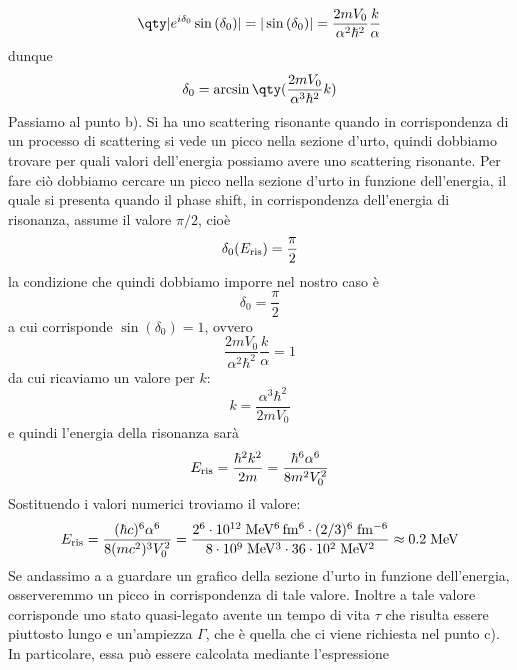 \begin{soluzione}
   \begin{equation*}
      \qty| e^{i\delta_0} \sin{(\delta_0)} |
      =| \sin{(\delta_0)} |
      =\frac{2 m V_0}{\alpha^2 \hbar^2} \frac{k}{\alpha}
   \end{equation*}
   dunque
   \begin{equation}
      \delta_0
      =\arcsin{\qty( \frac{2 m V_0}{\alpha^3 \hbar^2} k )}
      \label{eq:delta_0_non_small}
   \end{equation}
   Passiamo al punto b). Si ha uno scattering risonante quando in corrispondenza di un processo di scattering si vede un picco nella sezione d'urto, quindi dobbiamo trovare per quali valori dell'energia possiamo avere uno scattering risonante. Per fare ciò dobbiamo cercare un picco nella sezione d'urto in funzione dell'energia, il quale si presenta quando il phase shift, in corrispondenza dell'energia di risonanza, assume il valore $\pi/2$, cioè
   \begin{equation*}
      \delta_0(E_{\rm ris})
      =\frac{\pi}{2}
   \end{equation*}
   la condizione che quindi dobbiamo imporre nel nostro caso è
   \begin{equation*}
      \delta_0=\frac{\pi}{2}
   \end{equation*}
   a cui corrisponde $\sin{(\delta_0)}=1$, ovvero
   \begin{equation*}
      \frac{2 m V_0}{\alpha^2 \hbar^2} \frac{k}{\alpha}
      =1
   \end{equation*}
   da cui ricaviamo un valore per $k$:
   \begin{equation*}
      k
      =\frac{\alpha^3 \hbar^2}{2 m V_0}
   \end{equation*}
   e quindi l'energia della risonanza sarà
   \begin{equation*}
      E_{\rm ris}
      =\frac{\hbar^2 k^2}{2m}
      =\frac{\hbar^6 \alpha^6}{8m^2 V_0^2}
   \end{equation*}
   Sostituendo i valori numerici troviamo il valore:
   \begin{equation*}
      E_{\rm ris}
      =\frac{(\hbar c)^6 \alpha^6}{8 (m c^2)^3 V_0^2}
      =\rm \frac{2^6 \cdot 10^{12} \; MeV^6 \, fm^6 \cdot (2/3)^6 \; fm^{-6}}{8 \cdot 10^9 \; MeV^3 \cdot 36 \cdot 10^2 \; MeV^2}
      \approx 0.2 \rm \; MeV
   \end{equation*}
   Se andassimo a a guardare un grafico della sezione d'urto in funzione dell'energia, osserveremmo un picco in corrispondenza di tale valore. Inoltre a tale valore corrisponde uno stato quasi-legato avente un tempo di vita $\tau$ che risulta essere piuttosto lungo e un'ampiezza $\Gamma$, che è quella che ci viene richiesta nel punto c). In particolare, essa può essere calcolata mediante l'espressione

\end{soluzione}
